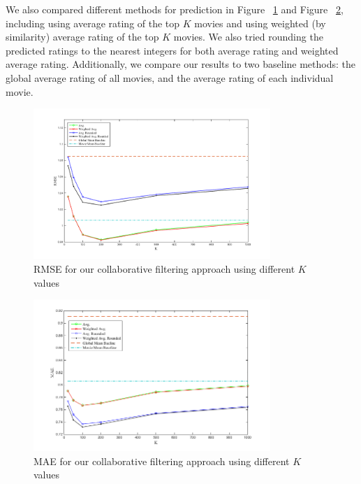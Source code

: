 We also compared different methods for prediction in Figure
~\ref{fig:rmse} and Figure ~\ref{fig:mae}, including using average
rating of the top $K$ movies and using weighted (by similarity)
average rating of the top $K$ movies. We also tried rounding the
predicted ratings to the nearest integers for both average rating and
weighted average rating. Additionally, we compare our results to two
baseline methods: the global average rating of all movies, and the
average rating of each individual movie.

\begin{figure}[!ht]
  \centering \includegraphics[width=0.8\textwidth]{images/rmse.png}
  \caption{RMSE for our collaborative filtering approach using
    different $K$ values}
  \label{fig:rmse}
\end{figure}

\begin{figure}[!ht]
  \centering \includegraphics[width=0.8\textwidth]{images/MAE.png}
  \caption{MAE for our collaborative filtering approach using
    different $K$ values}
  \label{fig:mae}
\end{figure}

